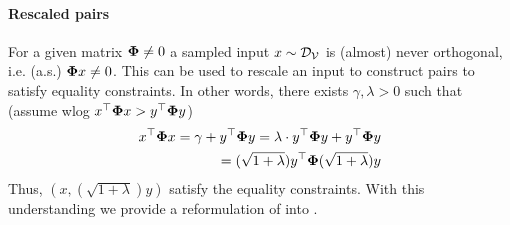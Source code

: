 \begin{figure*}[t]
    
    \label{fig: monosparse} %
\end{figure*}


\iffalse
\paragraph{Rescaled pairs} For a given matrix $\boldsymbol{\Phi} \neq 0$ a sampled input $x \sim {\mathcal{D}}_{{\mathcal{V}}}$ is (almost) never orthogonal, i.e. (a.s.) $\boldsymbol{\Phi} x \neq 0$. This can be used to rescale an input to construct pairs to satisfy equality constraints. In other words, there exists $\gamma, \lambda >0$ such that (assume wlog $x^{\top}\boldsymbol{\Phi} x > y^{\top}\boldsymbol{\Phi} y$)
\begin{align*}
    x^{\top}\boldsymbol{\Phi} x = \gamma + y^{\top}\boldsymbol{\Phi} y = \lambda\cdot y^{\top}\boldsymbol{\Phi} y + y^{\top}\boldsymbol{\Phi} y \\= (\sqrt{1 + \lambda})y^{\top}\boldsymbol{\Phi}(\sqrt{1 + \lambda})y 
\end{align*}
Thus, $(x, (\sqrt{1 + \lambda})y)$ satisfy the equality constraints. With this understanding we provide a reformulation of  into . %

